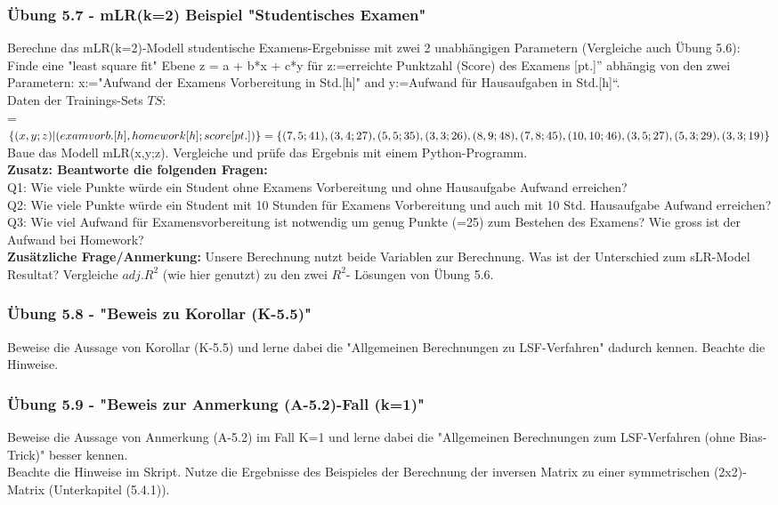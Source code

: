 \documentclass[12pt]{article}
\begin{document}
\subsubsection{Übung 5.7 - mLR(k=2) Beispiel "Studentisches Examen"}
%
Berechne das  mLR(k=2)-Modell studentische Examens-Ergebnisse mit zwei 2 unabhängigen Parametern (Vergleiche auch Übung 5.6):\\  
Finde eine "least square fit" Ebene  z = a + b*x + c*y für z:=erreichte Punktzahl (Score) des Examens [pt.]” abhängig von den zwei Parametern: x:="Aufwand der Examens Vorbereitung in Std.[h]" and y:=Aufwand für Hausaufgaben in Std.[h]“.\\[0.2cm]
Daten der Trainings-Sets $TS$: \\
= $ \lbrace (x, y; z) | (exam vorb.[h], homework[h]; score[pt.])\rbrace = \lbrace(7,5;41 ),(3,4;27), \\
(5,5;35), (3,3;26), (8,9;48), (7,8;45), (10,10;46), (3,5;27), (5,3;29), (3,3;19)\rbrace $ \\[0.2cm]
Baue das Modell mLR(x,y;z). Vergleiche und prüfe das Ergebnis mit einem Python-Programm.\\[0.2cm]
\textbf{Zusatz: Beantworte die folgenden Fragen:}\\ 
Q1: Wie viele Punkte würde ein Student ohne Examens Vorbereitung und ohne Hausaufgabe Aufwand erreichen? \\
Q2: Wie viele Punkte würde ein Student mit 10 Stunden für Examens Vorbereitung und auch mit 10 Std. Hausaufgabe Aufwand erreichen? \\ 
Q3: Wie viel Aufwand für Examensvorbereitung ist notwendig um genug Punkte (=25) zum Bestehen des Examens? Wie gross ist der Aufwand bei Homework?\\[0.2cm]
\textbf{Zusätzliche Frage/Anmerkung:} Unsere Berechnung nutzt beide Variablen zur Berechnung. Was ist der Unterschied zum sLR-Model Resultat? Vergleiche $adj.R^2$ (wie hier genutzt) zu den zwei $R^2$- Lösungen von Übung 5.6.\\
%
\subsubsection{Übung 5.8 - "Beweis zu Korollar (K-5.5)"}
%
Beweise die Aussage von Korollar (K-5.5) und lerne dabei die "Allgemeinen Berechnungen zu LSF-Verfahren" dadurch kennen. Beachte die Hinweise. 
%
\subsubsection{Übung 5.9 - "Beweis zur Anmerkung (A-5.2)-Fall (k=1)"}
%
Beweise die Aussage von Anmerkung (A-5.2) im Fall K=1 und lerne dabei die "Allgemeinen Berechnungen zum LSF-Verfahren (ohne Bias-Trick)" besser kennen.\\
Beachte die Hinweise im Skript. Nutze die Ergebnisse des Beispieles der Berechnung der inversen Matrix zu einer symmetrischen (2x2)-Matrix (Unterkapitel (5.4.1)).
%
\end{document}
